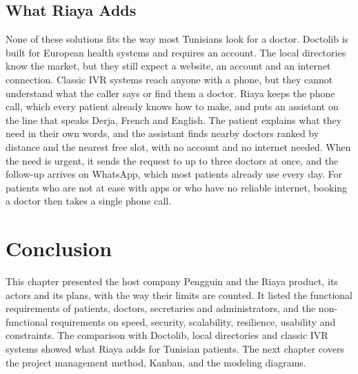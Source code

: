 \subsection{What Riaya Adds}
None of these solutions fits the way most Tunisians look for a doctor. Doctolib is built for European health systems and requires an account. The local directories know the market, but they still expect a website, an account and an internet connection. Classic IVR systems reach anyone with a phone, but they cannot understand what the caller says or find them a doctor. Riaya keeps the phone call, which every patient already knows how to make, and puts an assistant on the line that speaks Derja, French and English. The patient explains what they need in their own words, and the assistant finds nearby doctors ranked by distance and the nearest free slot, with no account and no internet needed. When the need is urgent, it sends the request to up to three doctors at once, and the follow-up arrives on WhatsApp, which most patients already use every day. For patients who are not at ease with apps or who have no reliable internet, booking a doctor then takes a single phone call.

\section{Conclusion}
This chapter presented the host company Pengguin and the Riaya product, its actors and its plans, with the way their limits are counted. It listed the functional requirements of patients, doctors, secretaries and administrators, and the non-functional requirements on speed, security, scalability, resilience, usability and constraints. The comparison with Doctolib, local directories and classic IVR systems showed what Riaya adds for Tunisian patients. The next chapter covers the project management method, Kanban, and the modeling diagrams.
